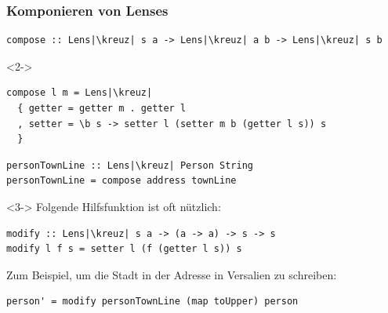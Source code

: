 \documentclass{beamer}
\newcommand{\kreuz}{$\,^\dag$} %
\begin{document}
\begin{frame}[fragile]
  \frametitle{Komponieren von Lenses}
\begin{verbatim}
compose :: Lens|\kreuz| s a -> Lens|\kreuz| a b -> Lens|\kreuz| s b
\end{verbatim}
  \vspace{-12pt}
  \begin{visibleenv}<2->
\begin{verbatim}
compose l m = Lens|\kreuz|
  { getter = getter m . getter l
  , setter = \b s -> setter l (setter m b (getter l s)) s
  }
\end{verbatim}
  \end{visibleenv}
\begin{verbatim}
personTownLine :: Lens|\kreuz| Person String
personTownLine = compose address townLine
\end{verbatim}

\vspace{1em}

  \begin{visibleenv}<3->
    Folgende Hilfsfunktion ist oft nützlich:
\begin{verbatim}
modify :: Lens|\kreuz| s a -> (a -> a) -> s -> s
modify l f s = setter l (f (getter l s)) s
\end{verbatim}
    Zum Beispiel, um die Stadt in der Adresse in Versalien zu schreiben:
\begin{verbatim}
person' = modify personTownLine (map toUpper) person
\end{verbatim}
  \end{visibleenv}
\end{frame}
\end{document}
